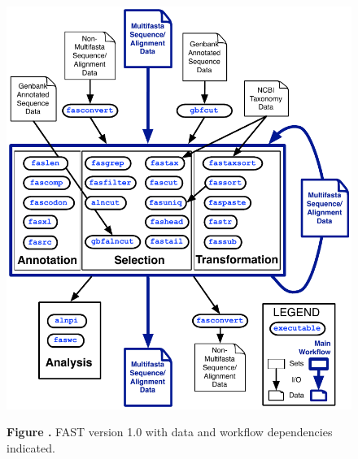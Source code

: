\documentclass{frontiersSCNS} %
\begin{document}
\begin{figure}
\begin{center}
\includegraphics[width=4.5in]{FAST_v8}%
\end{center}
 \textbf{\label{fig:01} Figure
   .}{ FAST version 1.0 with data and workflow
   dependencies indicated.}
\end{figure}
\end{document}
